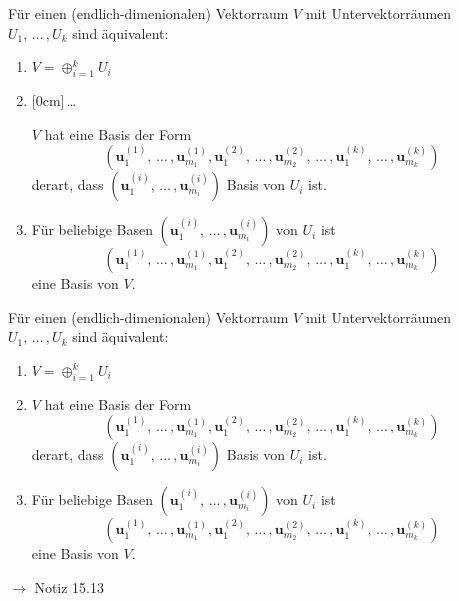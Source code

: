 \documentclass[11pt]{article}
\renewcommand{\cite}[1]{\par\bigskip\hfill{\color{gray}\tiny\(\to\) #1}}
\renewcommand{\vec}[1]{\mathbf{#1}}
\newcommand{\hide}[1]{\parbox{0cm}{\raisebox{-7pt}[0cm]{\dots}}\color{white}#1\color{black}}
\let\olddots\dots
\renewcommand{\dots}{\,\olddots\,}
\newenvironment{field}{}{\newpage}
\newif\ifnote
\newenvironment{note}{\notetrue}{\notefalse}
\begin{document}
\begin{note}
    \begin{field}
        \small
        Für einen (endlich-dimenionalen) Vektorraum $V$ mit Untervektorräumen $U_1,\dots,U_k$ sind äquivalent:
        \begin{enumerate}[(1)]
            \item $V = \oplus_{i=1}^k U_i$
            \item \hide{$V$ hat eine Basis der Form \[(\vec{u}_1^{(1)},\dots,\vec{u}_{m_1}^{(1)},\vec{u}_1^{(2)},\dots,\vec{u}_{m_2}^{(2)},\dots,\vec{u}_1^{(k)},\dots,\vec{u}_{m_k}^{(k)})\]
            derart, dass $(\vec{u}_1^{(i)}, \dots, \vec{u}_{m_i}^{(i)})$ Basis von $U_i$ ist.}
            \item Für beliebige Basen $(\vec{u}_1^{(i)}, \dots, \vec{u}_{m_i}^{(i)})$ von $U_i$ ist
             \[(\vec{u}_1^{(1)},\dots,\vec{u}_{m_1}^{(1)},\vec{u}_1^{(2)},\dots,\vec{u}_{m_2}^{(2)},\dots,\vec{u}_1^{(k)},\dots,\vec{u}_{m_k}^{(k)})\]
             eine Basis von $V$.
        \end{enumerate}
    \end{field}
    \begin{field}
        \small
        Für einen (endlich-dimenionalen) Vektorraum $V$ mit Untervektorräumen $U_1,\dots,U_k$ sind äquivalent:
        \begin{enumerate}[(1)]
            \item $V = \oplus_{i=1}^k U_i$
            \item $V$ hat eine Basis der Form \[(\vec{u}_1^{(1)},\dots,\vec{u}_{m_1}^{(1)},\vec{u}_1^{(2)},\dots,\vec{u}_{m_2}^{(2)},\dots,\vec{u}_1^{(k)},\dots,\vec{u}_{m_k}^{(k)})\]
            derart, dass $(\vec{u}_1^{(i)}, \dots, \vec{u}_{m_i}^{(i)})$ Basis von $U_i$ ist.
            \item Für beliebige Basen $(\vec{u}_1^{(i)}, \dots, \vec{u}_{m_i}^{(i)})$ von $U_i$ ist
             \[(\vec{u}_1^{(1)},\dots,\vec{u}_{m_1}^{(1)},\vec{u}_1^{(2)},\dots,\vec{u}_{m_2}^{(2)},\dots,\vec{u}_1^{(k)},\dots,\vec{u}_{m_k}^{(k)})\]
             eine Basis von $V$.
        \end{enumerate}
        \cite{Notiz 15.13}
    \end{field}


\end{note}
\end{document}
